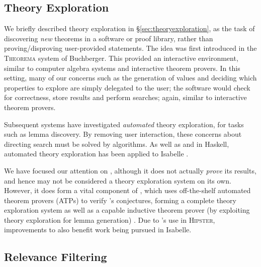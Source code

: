 \subsection{Theory Exploration}

We briefly described theory exploration in \S \ref{sec:theoryexploration}, as the task of discovering \emph{new} theorems in a software or proof library, rather than proving/disproving user-provided statements. The idea was first introduced in the \textsc{Theorema} \cite{buchberger2000theory} system of Buchberger. This provided an interactive environment, similar to computer algebra systems and interactive theorem provers. In this setting, many of our concerns such as the generation of values and deciding which properties to explore are simply delegated to the user; the software would check for correctness, store results and perform searches; again, similar to interactive theorem provers.

Subsequent systems have investigated \emph{automated} theory exploration, for tasks such as lemma discovery. By removing user interaction, these concerns about directing search must be solved by algorithms. As well as \qspec{} and \hspec{} in Haskell, automated theory exploration has been applied to Isabelle \citep{Montano-Rivas.McCasland.Dixon.ea:2012, johansson2009isacosy, Hipster}.

We have focused our attention on \qspec{}, although it does not actually \emph{prove} its results, and hence may not be considered a theory exploration system on its own. However, it does form a vital component of \hspec{}, which uses off-the-shelf automated theorem provers (ATPs) to verify \qspec{}'s conjectures, forming a complete theory exploration system as well as a capable inductive theorem prover (by exploiting theory exploration for lemma generation) \cite{claessen2013automating}. Due to \hspec{}'s use in \textsc{Hipster}, improvements to \qspec{} also benefit work being pursued in Isabelle.

\subsection{Relevance Filtering}
\label{sec:relevance}

